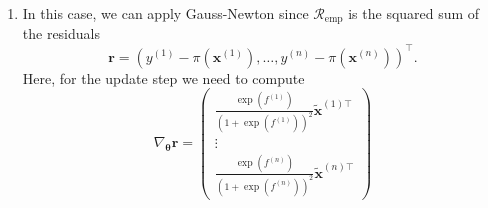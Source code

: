 \documentclass[a4paper]{article}
\makeatletter
\newcommand{\hlnum}[1]{\textcolor[rgb]{0.686,0.059,0.569}{#1}}%
\newcommand{\hlopt}[1]{\textcolor[rgb]{0,0,0}{#1}}%
\newcommand{\hlstd}[1]{\textcolor[rgb]{0.345,0.345,0.345}{#1}}%
\newcommand{\hlkwb}[1]{\textcolor[rgb]{0.69,0.353,0.396}{#1}}%
\newcommand{\hlkwc}[1]{\textcolor[rgb]{0.333,0.667,0.333}{#1}}%
\newcommand{\hlkwd}[1]{\textcolor[rgb]{0.737,0.353,0.396}{\textbf{#1}}}%
\newenvironment{kframe}{%
 \def\at@end@of@kframe{}%
 \ifinner\ifhmode%
  \def\at@end@of@kframe{\end{minipage}}%
  \begin{minipage}{\columnwidth}%
 \fi\fi%
 \def\FrameCommand##1{\hskip\@totalleftmargin \hskip-\fboxsep
 \colorbox{shadecolor}{##1}\hskip-\fboxsep
     \hskip-\linewidth \hskip-\@totalleftmargin \hskip\columnwidth}%
 \MakeFramed {\advance\hsize-\width
   \@totalleftmargin\z@ \linewidth\hsize
   \@setminipage}}%
 {\par\unskip\endMakeFramed%
 \at@end@of@kframe}
\newenvironment{knitrout}{}{} %
\makeatother
\begin{document}
{\begin{enumerate}
\begin{knitrout}
\begin{kframe}
\begin{alltt}
  \hlstd{thetas} \hlkwb{=} \hlkwd{rbind}\hlstd{(thetas, theta)}
\hlstd{\}}

\hlkwd{ggplot}\hlstd{(}\hlkwd{data.frame}\hlstd{(remps,} \hlkwc{t}\hlstd{=}\hlnum{1}\hlopt{:}\hlkwd{nrow}\hlstd{(remps)),} \hlkwd{aes}\hlstd{(}\hlkwc{x}\hlstd{=t,} \hlkwc{y}\hlstd{=remps))} \hlopt{+}
  \hlkwd{geom_line}\hlstd{()} \hlopt{+} \hlkwd{ylab}\hlstd{(}\hlkwd{expression}\hlstd{(R[emp]))}
\end{alltt}
\end{kframe}
\texttt{[image: figure/newton\_raphson-plot-1]} 
\begin{kframe}\begin{alltt}
\hlkwd{ggplot}\hlstd{(}\hlkwd{data.frame}\hlstd{(}\hlkwc{theta} \hlstd{=} \hlkwd{c}\hlstd{(thetas),} \hlkwc{t}\hlstd{=}\hlkwd{rep}\hlstd{(}\hlnum{1}\hlopt{:}\hlkwd{nrow}\hlstd{(thetas),}\hlnum{3}\hlstd{),}
                \hlkwc{id} \hlstd{=} \hlkwd{as.factor}\hlstd{(}\hlkwd{rep}\hlstd{(}\hlkwd{c}\hlstd{(}\hlnum{0}\hlstd{,} \hlnum{1}\hlstd{,} \hlnum{2}\hlstd{),} \hlkwc{each}\hlstd{=} \hlkwd{nrow}\hlstd{(thetas)))),}
       \hlkwd{aes}\hlstd{(}\hlkwc{x} \hlstd{= t,} \hlkwc{y}\hlstd{=theta))} \hlopt{+}
  \hlkwd{geom_line}\hlstd{(}\hlkwd{aes}\hlstd{(}\hlkwc{color} \hlstd{= id))} \hlopt{+} \hlkwd{ylab}\hlstd{(}\hlkwd{expression}\hlstd{(theta))}
\end{alltt}
\end{kframe}
\texttt{[image: figure/newton\_raphson-plot-2]} 
\begin{kframe}\begin{alltt}
\hlstd{theta}
\end{alltt}
\begin{verbatim}
## [1] -2.087122  6.667438 -5.967500
\end{verbatim}
\end{kframe}
\end{knitrout}
\item In this case, we can apply Gauss-Newton since $\mathcal{R}_{\text{emp}}$ is the squared sum of the residuals 
$$\mathbf{r} = (y^{(1)} - \pi(\mathbf{x}^{(1)}), \dots, y^{(n)} - \pi(\mathbf{x}^{(n)}))^\top.$$ Here, for the update step we need to compute 
$$\nabla_{\bm{\theta}}\mathbf{r} = \begin{pmatrix} \frac{\exp(f^{(1)})}{(1 + \exp(f^{(1)}))^2} {\tilde{\mathbf{x}}}^{(1)\top} \\ 
\vdots \\
\frac{\exp(f^{(n)})}{(1 + \exp(f^{(n)}))^2}{\tilde{\mathbf{x}}}^{(n)\top}
\end{pmatrix}$$ \\

\end{enumerate}}
\end{document}
